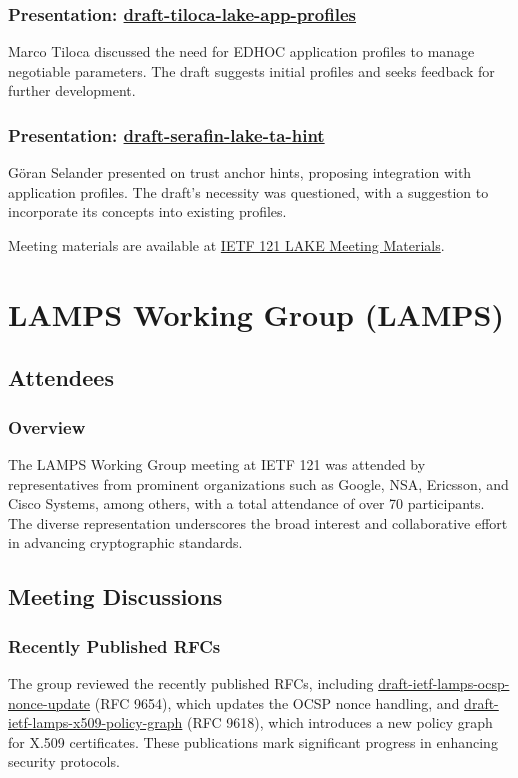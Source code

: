 \documentclass{article}
\begin{document}
\subsubsection{Presentation: \href{https://datatracker.ietf.org/doc/html/draft-tiloca-lake-app-profiles}{draft-tiloca-lake-app-profiles}}
Marco Tiloca discussed the need for EDHOC application profiles to manage negotiable parameters. The draft suggests initial profiles and seeks feedback for further development.

\subsubsection{Presentation: \href{https://datatracker.ietf.org/doc/html/draft-serafin-lake-ta-hint}{draft-serafin-lake-ta-hint}}
Göran Selander presented on trust anchor hints, proposing integration with application profiles. The draft's necessity was questioned, with a suggestion to incorporate its concepts into existing profiles.

Meeting materials are available at \href{https://datatracker.ietf.org/meeting/121/materials/slides-121-lake}{IETF 121 LAKE Meeting Materials}.




\newpage

\section{LAMPS Working Group (LAMPS)}

\subsection{Attendees}
\subsubsection{Overview}
The LAMPS Working Group meeting at IETF 121 was attended by representatives from prominent organizations such as Google, NSA, Ericsson, and Cisco Systems, among others, with a total attendance of over 70 participants. The diverse representation underscores the broad interest and collaborative effort in advancing cryptographic standards.

\subsection{Meeting Discussions}

\subsubsection{Recently Published RFCs}
The group reviewed the recently published RFCs, including \href{https://datatracker.ietf.org/doc/html/draft-ietf-lamps-ocsp-nonce-update}{draft-ietf-lamps-ocsp-nonce-update} (RFC 9654), which updates the OCSP nonce handling, and \href{https://datatracker.ietf.org/doc/html/draft-ietf-lamps-x509-policy-graph}{draft-ietf-lamps-x509-policy-graph} (RFC 9618), which introduces a new policy graph for X.509 certificates. These publications mark significant progress in enhancing security protocols.
\end{document}
